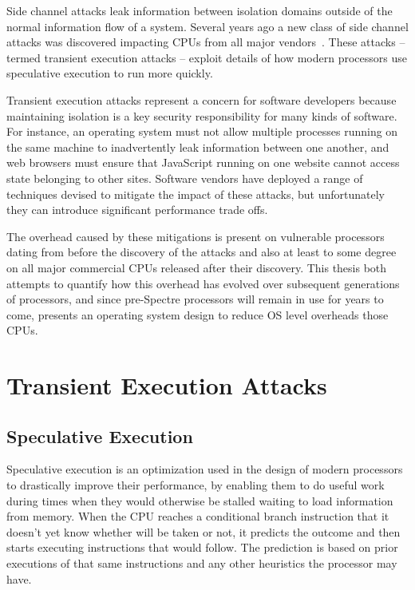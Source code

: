\noindent
Side channel attacks leak information between isolation domains outside of the normal information flow of a system.
Several years ago a new class of side channel attacks was discovered impacting CPUs from all major vendors~\cite{lipp:meltdown, kocher:spectre}.
These attacks -- termed transient execution attacks -- exploit details of how modern processors use speculative execution to run more quickly. 

Transient execution attacks represent a concern for software developers because maintaining isolation is a key security responsibility for many kinds of software.
For instance, an operating system must not allow multiple processes running on the same machine to inadvertently leak information between one another, and web browsers must ensure that JavaScript running on one website cannot access state belonging to other sites.
Software vendors have deployed a range of techniques devised to mitigate the impact of these attacks, but unfortunately they can introduce significant performance trade offs.

The overhead caused by these mitigations is present on vulnerable processors dating from before the discovery of the attacks and also at least to some degree on all major commercial CPUs released after their discovery.
This thesis both attempts to quantify how this overhead has evolved over subsequent generations of processors, and since pre-Spectre processors will remain in use for years to come, presents an operating system design to reduce OS level overheads those CPUs.



\section{Transient Execution Attacks}
\subsection{Speculative Execution}
Speculative execution is an optimization used in the design of modern processors to drastically improve their performance, by enabling them to do useful work during times when they would otherwise be stalled waiting to load information from memory.
When the CPU reaches a conditional branch instruction that it doesn't yet know whether will be taken or not, it predicts the outcome and then starts executing instructions that would follow.
The prediction is based on prior executions of that same instructions and any other heuristics the processor may have.

